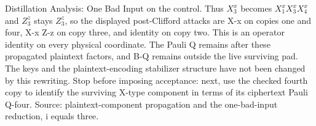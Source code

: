 \begin{frame}{Distillation Analysis: One Bad Input}
{    on the control. Thus $X_3^x$ becomes $X_1^xX_3^xX_4^x$ and
    $Z_3^z$ stays $Z_3^z$, so the displayed post-Clifford attacks are
    X-x on copies one and four, X-x Z-z on copy three, and identity
    on copy two. This is an operator identity on every physical
    coordinate. The Pauli Q remains after these propagated plaintext
    factors, and B-Q remains outside the live surviving pad.
    The keys and the plaintext-encoding stabilizer structure have
    not been changed by this rewriting. Stop before imposing acceptance:
    next, use the checked fourth copy to identify the surviving
    X-type component in terms of its ciphertext Pauli Q-four.
    Source: plaintext-component propagation and the one-bad-input
    reduction, i equals three.
  }
\end{frame}
